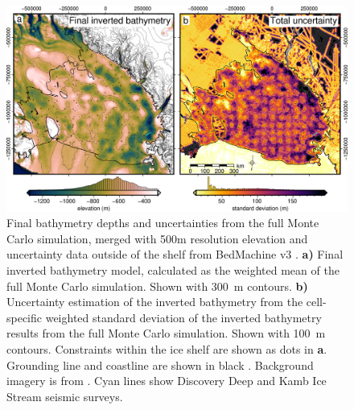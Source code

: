 \begin{figure}[!ht]
    \centering
    \includegraphics[width=.99\textwidth]{figures/chp4/RIS_MC_bed_and_uncert.png}
    \caption[Ross Ice Shelf inverted bathymetry and uncertainty]{Final bathymetry depths and uncertainties from the full Monte Carlo simulation, merged with 500m resolution elevation and uncertainty data outside of the shelf from BedMachine v3 \citep{morlighemdeep2020, morlighemmeasures2022}. \textbf{a)} Final inverted bathymetry model, calculated as the weighted mean of the full Monte Carlo simulation. Shown with 300~m contours. \textbf{b)} Uncertainty estimation of the inverted bathymetry from the cell-specific weighted standard deviation of the inverted bathymetry results from the full Monte Carlo simulation. Shown with 100~m contours. Constraints within the ice shelf are shown as dots in \textbf{a}. Grounding line and coastline are shown in black \citep{morlighemmeasures2022}. Background imagery is from \citet{scambosmodisbased2007}. Cyan lines show Discovery Deep and Kamb Ice Stream seismic surveys.}
    \label{fig:chp4_RIS_MC_results}
\end{figure}

